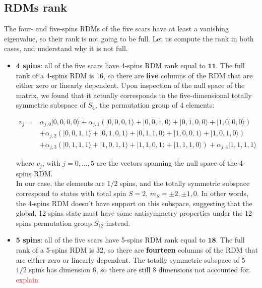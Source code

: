 \documentclass{article}
\begin{document}
\subsection{RDMs rank}

The four- and five-spins RDMs of the five scars have at least a vanishing eigenvalue, so their rank is not going to be full. Let us compute the rank in both cases, and understand why it is not full.

\begin{itemize}

\item \textbf{4 spins}: all of the five scars have 4-spins RDM rank equal to $\mathbf{11}$. The full rank of a 4-spins RDM is 16, so there are \textbf{five} columns of the RDM that are either zero or linearly dependent. Upon inspection of the null space of the matrix, we found that it actually corresponds to the five-dimensional totally symmetric subspace of $S_4$, the permutation group of 4 elements:

\begin{align}
v_j = &\alpha_{j,0} |0,0,0,0\rangle + \alpha_{j,1} \left(|0,0,0,1\rangle + |0,0,1,0\rangle + |0,1,0,0\rangle +  |1,0,0,0\rangle\right)\nonumber\\
&+\alpha_{j,2} \left( |0,0,1,1\rangle + |0,1,0,1\rangle + |0,1,1,0\rangle + |1,0,0,1\rangle + |1,0,1,0\rangle \right)\nonumber\\
&+\alpha_{j,3} \left( |0,1,1,1\rangle + |1,0,1,1\rangle + |1,1,0,1\rangle + |1,1,1,0\rangle\right) + \alpha_{j,4} |1,1,1,1\rangle
\end{align}

where $v_j$, with $j=0,\hdots,5$ are the vectors spanning the null space of the 4-spins RDM.\\
In our case, the elements are $1/2$ spins, and the totally symmetric subspace correspond to states with total spin $S=2, \,m_S = \pm 2, \pm 1, 0$. In other words, the 4-spins RDM doesn't have support on this subspace, suggesting that the global, 12-spins state must have some antisymmetry properties under the 12-spins permutation group $S_{12}$ instead.

\item \textbf{5 spins}: all of the five scars have 5-spins RDM rank equal to $\mathbf{18}$. The full rank of a 5-spins RDM is 32, so there are \textbf{fourteen} columns of the RDM that are either zero or linearly dependent. The totally symmetric subspace of 5 $1/2$ spins has dimension 6, so there are still 8 dimensions not accounted for. \textcolor{red}{explain}

\end{itemize}
\end{document}
